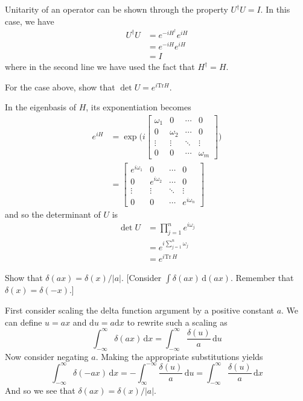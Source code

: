 \documentclass[../principles-of-quantum-mechanics.tex]{subfiles}
\begin{document}
\begin{questions}
\begin{solution}
	Unitarity of an operator can be shown through the property $U^\dagger{U}=I$. In this case, we have
	\begin{align*}
		U^\dagger U &= e^{-iH^\dagger}e^{iH} \\
		&= e^{-iH}e^{iH} \\
		&= I
	\end{align*}
	where in the second line we have used the fact that $H^\dagger = H$.
\end{solution}

\question For the case above, show that $\det{U}=e^{i\mathrm{Tr}H}$.

\begin{solution}
	In the eigenbasis of $H$, its exponentiation becomes
	\begin{align*}
		e^{iH} &= \exp\Big(i\begin{bmatrix}
			\omega_1 & 0 & \cdots & 0 \\
			0 & \omega_2 & \cdots & 0 \\
			\vdots & \vdots & \ddots & \vdots \\
			0 & 0 & \cdots & \omega_m
		\end{bmatrix}\Big) \\
	&= \begin{bmatrix}
		e^{i\omega_1} & 0 & \cdots & 0 \\
		0 & e^{i\omega_2} & \cdots & 0 \\
		\vdots & \vdots & \ddots & \vdots \\
		0 & 0 & \cdots & e^{i\omega_n}
	\end{bmatrix}
	\end{align*}
	and so the determinant of $U$ is
	\begin{align*}
		\det U &= \prod_{j=1}^n e^{i\omega_j} \\
		&= e^{i\sum_{j=1}^n\omega_j} \\
		&= e^{i\mathrm{Tr}\,H}
	\end{align*}
\end{solution}

\question Show that $\delta(ax) = \delta(x)/|a|$. [Consider $\int\delta(ax)\,\mathrm{d}(ax)$. Remember that $\delta(x)=\delta(-x)$.]

\begin{solution}
	First consider scaling the delta function argument by a positive constant $a$. We can define $u = ax$ and $\mathrm{d}u = a\mathrm{d}x$ to rewrite such a scaling as
	\[
		\int_{-\infty}^{\infty}\delta(ax)\,\mathrm{d}x = \int_{-\infty}^{\infty}\frac{\delta(u)}{a}\,\mathrm{d}u
	\]
	Now consider negating $a$. Making the appropriate substitutions yields
	\[
	\int_{-\infty}^{\infty}\delta(-ax)\,\mathrm{d}x = -\int_{\infty}^{-\infty}\frac{\delta(u)}{a}\,\mathrm{d}u = \int_{-\infty}^{\infty}\frac{\delta(u)}{a}\,\mathrm{d}x
	\]
	And so we see that $\delta(ax) = \delta(x)/|a|$.
\end{solution}


\end{questions}
\end{document}

